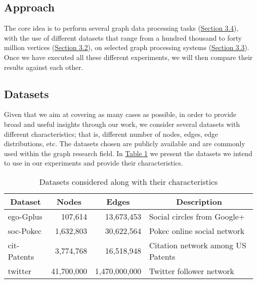 \documentclass[a4paper,11pt]{article}
\begin{document}
\subsection{Approach} \label{approach}

\par The core idea is to perform several graph data processing tasks (\hyperref[algos]{Section 3.4}), with the use of different datasets that range from a hundred thousand to forty million vertices (\hyperref[datasets]{Section 3.2}), on selected graph processing systems (\hyperref[graph-proc]{Section 3.3}). Once we have executed all these different experiments, we will then compare their results against each other.

\subsection{Datasets} \label{datasets}

\par Given that we aim at covering as many cases as possible, in order to provide broad and useful insights through our work, we consider several datasets with different characteristics; that is, different number of nodes, edges, edge distributions, etc. The datasets chosen are publicly available and are commonly used within the graph research field. In \hyperref[dataset-table]{Table 1} we present the datasets we intend to use in our experiments and provide their characteristics.

\bigskip

\begin{table}[H]
	\centering
	\begin{tabular}{|l|r|r|l|}
	\hline
	\multicolumn{1}{|c|}{\textbf{Dataset}} & \multicolumn{1}{c|}{\textbf{Nodes}} & \multicolumn{1}{c|}{\textbf{Edges}} & \multicolumn{1}{c|}{\textbf{Description}} \\ \hline
	\hline
	ego-Gplus \cite{snapnets} & 107,614 & 13,673,453 & Social circles from Google+ \\ \hline
	soc-Pokec \cite{snapnets} & 1,632,803 & 30,622,564 & Pokec online social network \\ \hline
	cit-Patents \cite{snapnets} & 3,774,768 & 16,518,948 & Citation network among US Patents \\ \hline
	twitter \cite{twitter} & 41,700,000 & 1,470,000,000 & Twitter follower network \\ \hline
	\end{tabular}
	\caption{Datasets considered along with their characteristics}
	\label{dataset-table}
\end{table}
\end{document}
